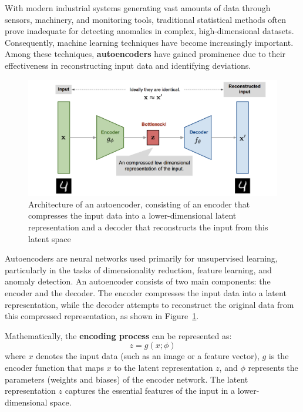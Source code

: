 \documentclass[12pt,DIV14,BCOR12mm,a4paper,footinclude=false,headinclude,parskip=half-,twoside,openright,cleardoublepage=empty,toc=index,bibliography=totoc,listof=totoc]{scrreprt}
\numberwithin{equation}{chapter}
\begin{document}
With modern industrial systems generating vast amounts of data through sensors, machinery, and monitoring tools, traditional statistical methods often prove inadequate for detecting anomalies in complex, high-dimensional datasets. Consequently, machine learning techniques have become increasingly important. Among these techniques, \textbf{autoencoders} have gained prominence due to their effectiveness in reconstructing input data and identifying deviations.
\begin{figure}
	\centering
	\includegraphics[scale=.55]{../media/autoencoder-architecture.png}
	\caption{Architecture of an autoencoder, consisting of an encoder that compresses the input data into a lower-dimensional latent representation and a decoder that reconstructs the input from this latent space\cite{Khandelwal:2021}}
	\label{autoencoder}
\end{figure}

Autoencoders are neural networks used primarily for unsupervised learning, particularly in the tasks of dimensionality reduction, feature learning, and anomaly detection. An autoencoder consists of two main components: the encoder and the decoder. The encoder compresses the input data into a latent representation, while the decoder attempts to reconstruct the original data from this compressed representation, as shown in Figure~\ref{autoencoder}.

Mathematically, the \textbf{encoding process} can be represented as:
\begin{equation}
z = g(x; \phi)
\end{equation}
where \( x \) denotes the input data (such as an image or a feature vector), \( g \) is the encoder function that maps \( x \) to the latent representation \( z \), and \( \phi \) represents the parameters (weights and biases) of the encoder network. The latent representation \( z \) captures the essential features of the input in a lower-dimensional space.
\end{document}
